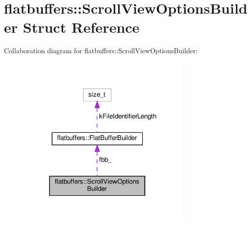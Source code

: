 \hypertarget{structflatbuffers_1_1ScrollViewOptionsBuilder}{}\section{flatbuffers\+:\+:Scroll\+View\+Options\+Builder Struct Reference}
\label{structflatbuffers_1_1ScrollViewOptionsBuilder}


Collaboration diagram for flatbuffers\+:\+:Scroll\+View\+Options\+Builder\+:
\nopagebreak
\begin{figure}[H]
\begin{center}
\leavevmode
\includegraphics[width=244pt]{structflatbuffers_1_1ScrollViewOptionsBuilder__coll__graph}
\end{center}
\end{figure}
